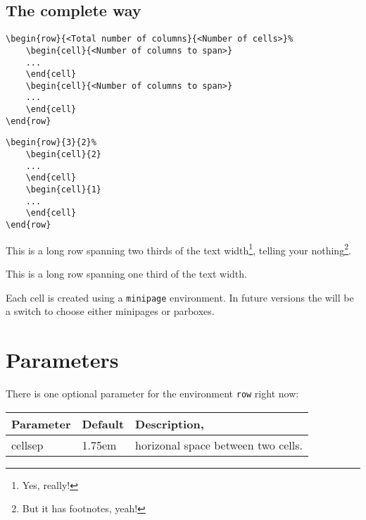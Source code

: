 \documentclass[DIV13]{scrartcl}
\begin{document}
\clearpage

\subsection{The complete way}
\begin{lstlisting}
\begin{row}{<Total number of columns}{<Number of cells>}%
	\begin{cell}{<Number of columns to span>}
	...
	\end{cell}
	\begin{cell}{<Number of columns to span>}
	...
	\end{cell}
\end{row}
\end{lstlisting}

\begin{lstlisting}
\begin{row}{3}{2}%
	\begin{cell}{2}
	...
	\end{cell}
	\begin{cell}{1}
	...
	\end{cell}
\end{row}
\end{lstlisting}

\begin{row}{3}{2}%
	\begin{cell}{2}
	This is a long row spanning two thirds of the text width\footnote{Yes, really!}, telling your nothing\footnote{But it has footnotes, yeah!}.
	\end{cell}
	\begin{cell}{1}
	This is a long row spanning one third of the text width.
	\end{cell}
\end{row}

\bigskip

Each cell is created using a \texttt{minipage} environment. In future versions the will be a switch to choose either minipages or parboxes.

\section{Parameters}
There is one optional parameter for the environment \texttt{row} right now:

\medskip

\begin{tabularx}{\linewidth}{llX}\toprule
\textbf{Parameter} & \textbf{Default} & \textbf{Description},\\ \midrule
cellsep & 1.75em & horizonal space between two cells.\\\bottomrule
\end{tabularx}
\end{document}
